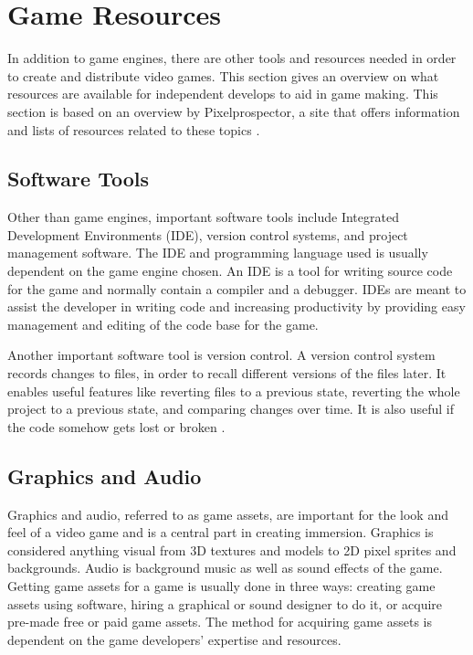 \section{Game Resources}
In addition to game engines, there are other tools and resources needed in order to create and distribute video games. This section gives an overview on what resources are available for independent develops to aid in game making. This section is based on an overview by Pixelprospector, a site that offers information and lists of resources related to these topics \cite{pixel2016prospector}.

\subsection{Software Tools}
Other than game engines, important software tools include Integrated Development Environments (IDE), version control systems, and project management software. The IDE and programming language used is usually dependent on the game engine chosen. An IDE is a tool for writing source code for the game and normally contain a compiler and a debugger. IDEs are meant to assist the developer in writing code and increasing productivity by providing easy management and editing of the code base for the game.

Another important software tool is version control. A version control system records changes to files, in order to recall different versions of the files later. It enables useful features like reverting files to a previous state, reverting the whole project to a previous state, and comparing changes over time. It is also useful if the code somehow gets lost or broken \cite{git2016vcs}.

\subsection{Graphics and Audio}
Graphics and audio, referred to as game assets, are important for the look and feel of a video game and is a central part in creating immersion. Graphics is considered anything visual from 3D textures and models to 2D pixel sprites and backgrounds. Audio is background music as well as sound effects of the game. Getting game assets for a game is usually done in three ways: creating game assets using software, hiring a graphical or sound designer to do it, or acquire pre-made free or paid game assets. The method for acquiring game assets is dependent on the game developers' expertise and resources.

